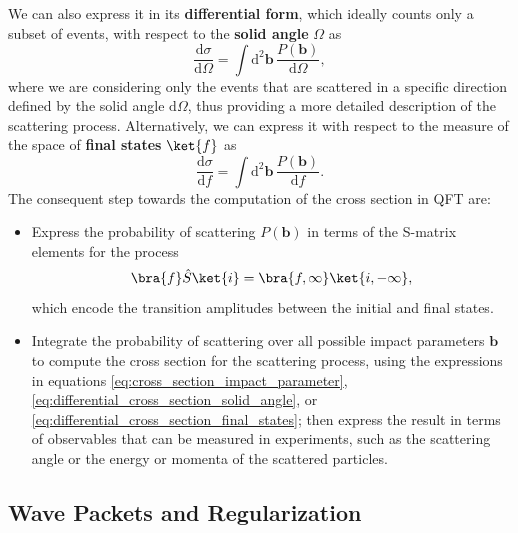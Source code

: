 We can also express it in its \textbf{differential form}, which ideally counts only a subset of events, with respect to the \textbf{solid angle} \(\Omega\) as
\begin{equation}
    \frac{\mathrm{d} \sigma}{\mathrm{d} \Omega} = \int \mathrm{d}^2 \mathbf{b} \, \frac{P(\mathbf{b})}{\mathrm{d} \Omega},
    \label{eq:differential_cross_section_solid_angle}
\end{equation}
where we are considering only the events that are scattered in a specific direction defined by the solid angle \(\mathrm{d}\Omega\), thus providing a more detailed description of the scattering process. Alternatively, we can express it with respect to the measure of the space of \textbf{final states} \(\ket{f}\) as
\begin{equation}
    \frac{\mathrm{d} \sigma}{\mathrm{d} f} = \int \mathrm{d}^2 \mathbf{b} \, \frac{P(\mathbf{b})}{\mathrm{d} f}.
    \label{eq:differential_cross_section_final_states}
\end{equation}
The consequent step towards the computation of the cross section in QFT are:
\begin{itemize}
    \item Express the probability of scattering \(P(\mathbf{b})\) in terms of the S-matrix elements for the process
          \[
              \bra{f} \hat{S} \ket{i} = \bra{f, \infty} \ket{i, -\infty},
          \]
          which encode the transition amplitudes between the initial and final states.
    \item Integrate the probability of scattering over all possible impact parameters \(\mathbf{b}\) to compute the cross section for the scattering process, using the expressions in equations \eqref{eq:cross_section_impact_parameter}, \eqref{eq:differential_cross_section_solid_angle}, or \eqref{eq:differential_cross_section_final_states}; then express the result in terms of observables that can be measured in experiments, such as the scattering angle or the energy or momenta of the scattered particles.
\end{itemize}

\subsection{Wave Packets and Regularization}

